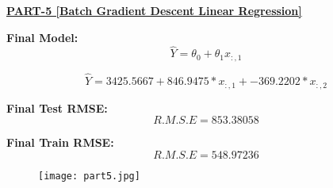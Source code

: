 \documentclass{report}
\begin{document}
\begin{flushleft}
\underline { \textbf{PART-5 [Batch Gradient Descent Linear Regression]}}  \linebreak[2]

\textbf{Final Model:} \linebreak[2]
\begin{equation}
\hat{Y} = \theta_0 + \theta_{1} x_{:, 1}
\end{equation}

\begin{equation}
\hat{Y} = 3425.5667 + 846.9475*x_{:, 1} + -369.2202*x_{:, 2}
\end{equation}

\textbf{Final Test RMSE:} \linebreak[2]
\begin{equation}
R.M.S.E = 853.38058
\end{equation}

\textbf{Final Train RMSE:} \linebreak[2]
\begin{equation}
R.M.S.E = 548.97236
\end{equation}

\break

\begin{figure}[tph!]
\centering
\texttt{[image: part5.jpg]}
\end{figure}

\end{flushleft} 
\end{document}

